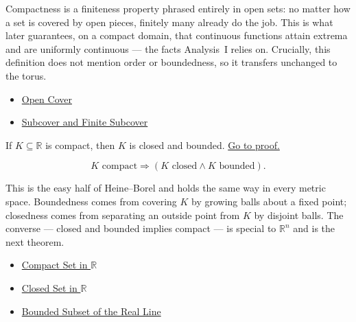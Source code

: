 \begin{remark*}[Interpretation]
Compactness is a finiteness property phrased entirely in open sets: no matter how a set is covered by open pieces, finitely many already do the job. This is what later guarantees, on a compact domain, that continuous functions attain extrema and are uniformly continuous --- the facts Analysis~I relies on. Crucially, this definition does not mention order or boundedness, so it transfers unchanged to the torus.
\end{remark*}
\begin{dependencies}
\begin{itemize}
  \item \hyperref[def:open-cover]{Open Cover}
  \item \hyperref[def:finite-subcover]{Subcover and Finite Subcover}
\end{itemize}
\end{dependencies}
\begin{tcolorbox}[colback=thmbox, colframe=thmborder, arc=2pt,
  left=6pt, right=6pt, top=4pt, bottom=4pt,
  title={\small\textbf{Theorem (Compact Subsets of $\mathbb{R}$ Are Closed and Bounded)}},
  fonttitle=\small\bfseries]
\begin{theorem}
\label{thm:compact-implies-closed-bounded}
If $K\subseteq\mathbb{R}$ is compact, then $K$ is closed and bounded.
\hyperref[prf:compact-implies-closed-bounded]{Go to proof.}
\end{theorem}
\end{tcolorbox}
\begin{remark*}
\[
K \text{ compact} \Longrightarrow (K \text{ closed} \land K \text{ bounded}).
\]
\end{remark*}
\begin{remark*}[Interpretation]
This is the easy half of Heine--Borel and holds the same way in every metric space. Boundedness comes from covering $K$ by growing balls about a fixed point; closedness comes from separating an outside point from $K$ by disjoint balls. The converse --- closed and bounded implies compact --- is special to $\mathbb{R}^{n}$ and is the next theorem.
\end{remark*}
\begin{dependencies}
\begin{itemize}
  \item \hyperref[def:compact-set]{Compact Set in $\mathbb{R}$}
  \item \hyperref[def:closed-set]{Closed Set in $\mathbb{R}$}
  \item \hyperref[def:bounded-subset-of-r]{Bounded Subset of the Real Line}
\end{itemize}
\end{dependencies}
